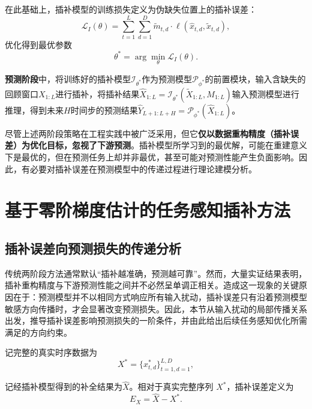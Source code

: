 \documentclass{article}
\begin{document}
在此基础上，插补模型的训练损失定义为伪缺失位置上的插补误差：
\begin{equation}
	\mathcal{L}_{I}(\theta) =\sum_{t=1}^L\sum_{d=1}^D\tilde{m}_{t,d}\cdot\ell(\hat{x}_{t,d},\tilde{x}_{t,d}),
\end{equation}
优化得到最优参数
\begin{equation}
	\theta^\ast =\arg\min_{\theta}\mathcal{L}_{I}(\theta).
\end{equation}

\textbf{预测阶段}中，将训练好的插补模型$\mathcal{I}_{\theta^\ast}$作为预测模型$\mathcal{P}_{\phi^\ast}$的前置模块，输入含缺失的回顾窗口$X_{1:L}$进行插补，将插补结果$\hat{X}_{1:L} =\mathcal{I}_{\theta^\ast}(\tilde{X}_{1:L}, M_{1:L})$输入预测模型进行推理，得到未来$H$时间步的预测结果$\hat{Y}_{L+1:L+H} =\mathcal{P}_{\phi^\ast}(\hat{X}_{1:L})$。

尽管上述两阶段策略在工程实践中被广泛采用，但它\textbf{仅以数据重构精度（插补误差）为优化目标，忽视了下游预测}。插补模型所学习到的最优解，可能在重建意义下是最优的，但在预测任务上却并非最优，甚至可能对预测性能产生负面影响。因此，有必要对插补误差在预测模型中的传递过程进行理论建模分析。

\section{基于零阶梯度估计的任务感知插补方法}

\subsection{插补误差向预测损失的传递分析}

传统两阶段方法通常默认“插补越准确，预测越可靠”。然而，大量实证结果表明\citep{shadbahr2023}，插补重构精度与下游预测性能之间并不必然呈单调正相关。造成这一现象的关键原因在于：预测模型并不以相同方式响应所有输入扰动，插补误差只有沿着预测模型敏感方向传播时，才会显著改变预测损失。因此，本节从输入扰动的局部传播关系出发，推导插补误差影响预测损失的一阶条件，并由此给出后续任务感知优化所需满足的方向约束。

记完整的真实时序数据为
\begin{equation}
	X^\ast =\{x_{t,d}^\ast\}_{t=1,d=1}^{L,D},
\end{equation}

记经插补模型得到的补全结果为$\hat{X}$。相对于真实完整序列 $X^\ast$，插补误差定义为
\begin{equation}
	E_X =\hat{X} - X^\ast.
\end{equation}
\end{document}
